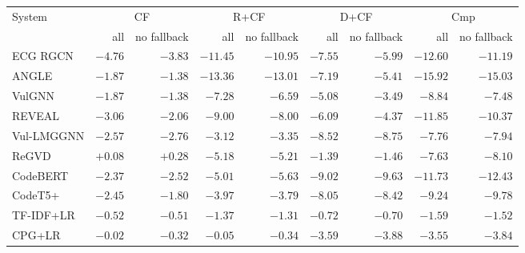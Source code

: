 \begin{tabular}{lrrrrrrrr}
\toprule
System & \multicolumn{2}{c}{CF} & \multicolumn{2}{c}{R+CF} & \multicolumn{2}{c}{D+CF} & \multicolumn{2}{c}{Cmp} \\
 & all & no fallback & all & no fallback & all & no fallback & all & no fallback \\
\midrule
ECG RGCN & $\mathbf{-4.76}$ & $\mathbf{-3.83}$ & $\mathbf{-11.45}$ & $\mathbf{-10.95}$ & $\mathbf{-7.55}$ & $\mathbf{-5.99}$ & $\mathbf{-12.60}$ & $\mathbf{-11.19}$ \\
ANGLE & $\mathbf{-1.87}$ & $-1.38$ & $\mathbf{-13.36}$ & $\mathbf{-13.01}$ & $\mathbf{-7.19}$ & $\mathbf{-5.41}$ & $\mathbf{-15.92}$ & $\mathbf{-15.03}$ \\
VulGNN & $\mathbf{-1.87}$ & $\mathbf{-1.38}$ & $\mathbf{-7.28}$ & $\mathbf{-6.59}$ & $\mathbf{-5.08}$ & $\mathbf{-3.49}$ & $\mathbf{-8.84}$ & $\mathbf{-7.48}$ \\
REVEAL & $\mathbf{-3.06}$ & $-2.06$ & $\mathbf{-9.00}$ & $\mathbf{-8.00}$ & $\mathbf{-6.09}$ & $\mathbf{-4.37}$ & $\mathbf{-11.85}$ & $\mathbf{-10.37}$ \\
Vul-LMGGNN & $\mathbf{-2.57}$ & $\mathbf{-2.76}$ & $\mathbf{-3.12}$ & $\mathbf{-3.35}$ & $\mathbf{-8.52}$ & $\mathbf{-8.75}$ & $\mathbf{-7.76}$ & $\mathbf{-7.94}$ \\
ReGVD & $+0.08$ & $+0.28$ & $\mathbf{-5.18}$ & $\mathbf{-5.21}$ & $-1.39$ & $-1.46$ & $\mathbf{-7.63}$ & $\mathbf{-8.10}$ \\
CodeBERT & $\mathbf{-2.37}$ & $\mathbf{-2.52}$ & $\mathbf{-5.01}$ & $\mathbf{-5.63}$ & $\mathbf{-9.02}$ & $\mathbf{-9.63}$ & $\mathbf{-11.73}$ & $\mathbf{-12.43}$ \\
CodeT5+ & $\mathbf{-2.45}$ & $\mathbf{-1.80}$ & $\mathbf{-3.97}$ & $\mathbf{-3.79}$ & $\mathbf{-8.05}$ & $\mathbf{-8.42}$ & $\mathbf{-9.24}$ & $\mathbf{-9.78}$ \\
TF-IDF+LR & $-0.52$ & $-0.51$ & $-1.37$ & $-1.31$ & $-0.72$ & $-0.70$ & $-1.59$ & $-1.52$ \\
CPG+LR & $-0.02$ & $-0.32$ & $-0.05$ & $-0.34$ & $-3.59$ & $-3.88$ & $-3.55$ & $-3.84$ \\
\bottomrule
\end{tabular}
